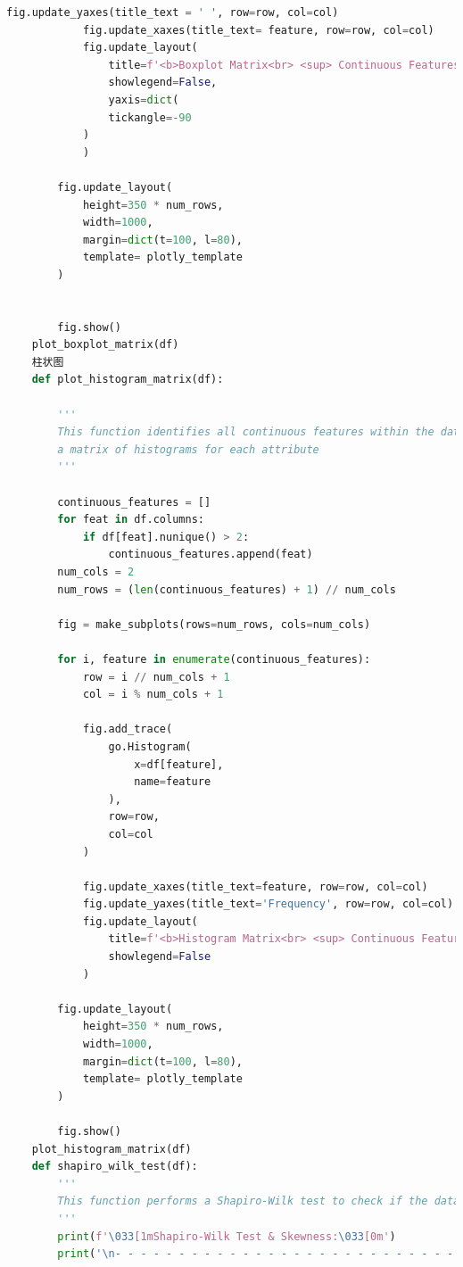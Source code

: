 \documentclass{apmcmthesis}
\begin{document}
\begin{lstlisting}[language=Python,caption={The Python Source code of Algorithm}]
            fig.update_yaxes(title_text = ' ', row=row, col=col)
            fig.update_xaxes(title_text= feature, row=row, col=col)
            fig.update_layout(
                title=f'<b>Boxplot Matrix<br> <sup> Continuous Features</sup></b>',
                showlegend=False,
                yaxis=dict(
                tickangle=-90  
            )
            )
    
        fig.update_layout(
            height=350 * num_rows,
            width=1000,
            margin=dict(t=100, l=80),
            template= plotly_template
        )
    
    
        fig.show()
    plot_boxplot_matrix(df)
    柱状图
    def plot_histogram_matrix(df):
        
        '''
        This function identifies all continuous features within the dataset and plots
        a matrix of histograms for each attribute
        '''
        
        continuous_features = []
        for feat in df.columns:
            if df[feat].nunique() > 2:
                continuous_features.append(feat)
        num_cols = 2
        num_rows = (len(continuous_features) + 1) // num_cols
    
        fig = make_subplots(rows=num_rows, cols=num_cols)
    
        for i, feature in enumerate(continuous_features):
            row = i // num_cols + 1
            col = i % num_cols + 1
    
            fig.add_trace(
                go.Histogram(
                    x=df[feature],
                    name=feature
                ),
                row=row,
                col=col
            )
    
            fig.update_xaxes(title_text=feature, row=row, col=col)
            fig.update_yaxes(title_text='Frequency', row=row, col=col)
            fig.update_layout(
                title=f'<b>Histogram Matrix<br> <sup> Continuous Features</sup></b>',
                showlegend=False
            )
    
        fig.update_layout(
            height=350 * num_rows,
            width=1000,
            margin=dict(t=100, l=80),
            template= plotly_template
        )
    
        fig.show()
    plot_histogram_matrix(df)
    def shapiro_wilk_test(df):
        '''
        This function performs a Shapiro-Wilk test to check if the data is normally distributed or not, as well as skewness
        '''
        print(f'\033[1mShapiro-Wilk Test & Skewness:\033[0m')
        print('\n- - - - - - - - - - - - - - - - - - - - - - - - - - - - - - - - - - - - - - - - - - - - - - - - - - - -  \n')
    

\end{lstlisting}
\end{document}
